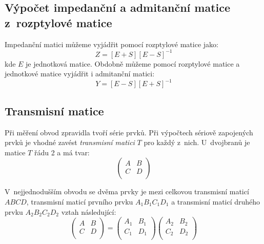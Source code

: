 \documentclass{protokol}
\begin{document}
\subsection{Výpočet impedanční a admitanční matice z~rozptylové matice}

Impedanční matici můžeme vyjádřit pomocí rozptylové matice jako:
\begin{equation}
	\label{eq:zmatrix-smatrix}
	Z = [E + S] [E - S]^{-1}
\end{equation}
kde $E$ je jednotková matice.
Obdobně můžeme pomocí rozptylové matice a jednotkové matice
vyjádřit i admitanční matici:
\begin{equation}
	\label{eq:ymatrix-smatrix}
	Y = [E - S] [E + S]^{-1}
\end{equation}

\subsection{Transmisní matice}
Při měření obvod zpravidla tvoří série prvků.
Při výpočtech sériově zapojených prvků je vhodné zavést
\emph{transmisní matici} $T$ pro každý z~nich.
U~dvojbranů je matice $T$ řádu 2 a má tvar:
\begin{equation}
	\label{eq:tmatrix}
	\begin{pmatrix}
		A & B  \\
		C & D  \\
	\end{pmatrix}
\end{equation}

V~nejjednodušším obvodu se dvěma prvky je mezi celkovou transmisní
maticí $ABCD$, transmisní maticí prvního prvku $A_1B_1C_1D_1$
a transmisní maticí druhého prvku $A_2B_2C_2D_2$ vztah následující:
\begin{equation}
	\label{eq:tmatrix-series}
	\begin{pmatrix}
		A & B  \\
		C &	D  \\
	\end{pmatrix}
	=
	\begin{pmatrix}
		A_1 & B_1  \\
		C_1 & D_1  \\
	\end{pmatrix}
	\begin{pmatrix}
		A_2 & B_2  \\
		C_2 & D_2  \\
	\end{pmatrix}
\end{equation}
\end{document}
